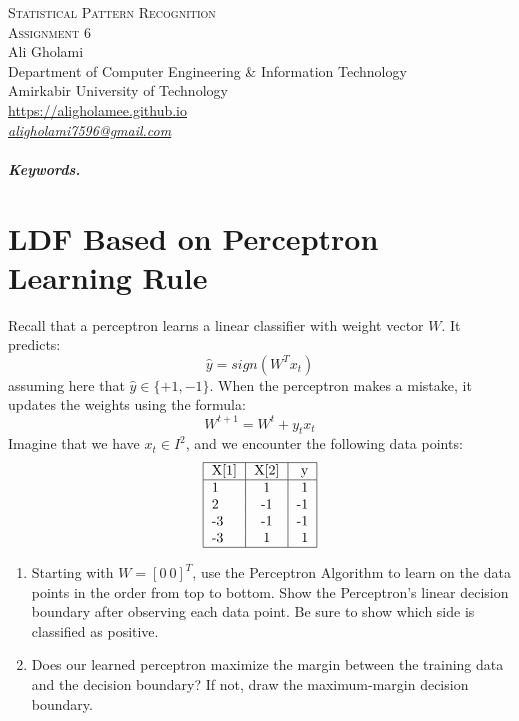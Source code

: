 \documentclass[12pt]{article}
\numberwithin{equation}{section}
\numberwithin{table}{section}
\numberwithin{figure}{section}
\begin{document}

\begin{center}
\textsc{\Large Statistical Pattern Recognition} \\[2pt]
	\textsc{\large Assignment 6}\\
	\vspace{0.5cm}
  Ali Gholami \\[6pt]
  Department of Computer Engineering \& Information Technology\\
  Amirkabir University of Technology  \\[6pt]
  \def\UrlFont{\em}
  \url{https://aligholamee.github.io}\\
    \href{mailto:aligholami7596@gmail.com}{\textit{aligholami7596@gmail.com}}
\end{center}

\begin{abstract}

\end{abstract}

\subparagraph{Keywords.} \textit{}


\section{LDF Based on Perceptron Learning Rule}
Recall that a perceptron learns a linear classifier with weight vector $W$. It predicts:
$$
	\hat{y} = sign(W^Tx_t) 
$$
assuming here that $ \hat{y} \in \{+1, -1\} $. When the perceptron makes a mistake, it updates the weights using the formula:
$$
	W^{t + 1} = W^t + y_tx_t
$$
Imagine that we have $x_t \in I^2$, and we encounter the following data points:
$$
\begin{tabular}{ | l | c | r |}
\hline	
X[1] & X[2] & y \\ \hline		
1 & 1 & 1 \\
2 & -1 & -1 \\
-3 & -1 & -1 \\
-3 & 1 & 1 \\
\hline  
\end{tabular}
$$
\begin{enumerate}[label=(\alph*)]
	\item Starting with $W = [0\ 0]^T$, use the Perceptron Algorithm to learn on the data points in the order from top to bottom. Show the Perceptron's linear decision boundary after observing each data point. Be sure to show which side is classified as positive.
	
	\item Does our learned perceptron maximize the margin between the training data and the decision boundary? If not, draw the maximum-margin decision boundary.
\end{enumerate}
\end{document}
